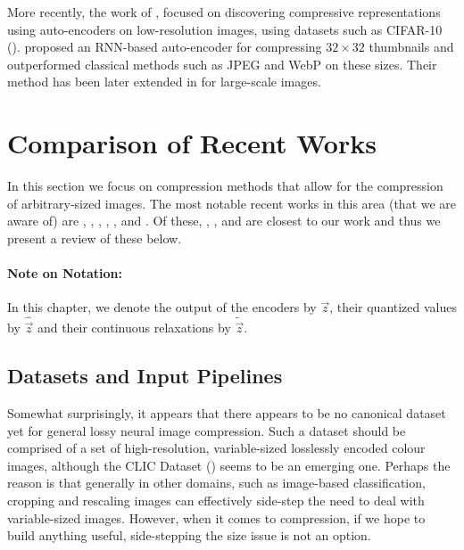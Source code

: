 \par 
More recently, the work of \cite{denton2015deep}, \cite{gregor2015draw} focused
on discovering compressive representations using auto-encoders on low-resolution
images, using datasets such as CIFAR-10 (\cite{krizhevsky2009learning}).
\cite{toderici2015variable} proposed an RNN-based auto-encoder for compressing $32
\times 32$ thumbnails and outperformed classical methods such as JPEG and WebP
on these sizes. Their method has been later extended in \cite{toderici2017full}
for large-scale images. 

\section{Comparison of Recent Works}
\label{sec:lit_comparison}
\par
In this section we focus on compression methods that allow for the compression
of arbitrary-sized images. The most notable recent works in this area (that we
are aware of) are \cite{balle2016end}, \cite{toderici2017full}, \cite{theis2017lossy},
\cite{rippel2017real}, \cite{balle2018variational}, \cite{johnston2018cvpr} and
\cite{mentzer2018cvpr}. Of these, \cite{balle2016end}, \cite{theis2017lossy},
\cite{rippel2017real} and \cite{balle2018variational} are closest to our work and
thus we present a review of these below.

\paragraph{Note on Notation:} In this chapter, we denote the output of the
encoders by $\vec{z}$, their quantized values by $\hat{\vec{z}}$ and their
continuous relaxations by $\tilde{\vec{z}}$.

\subsection{Datasets and Input Pipelines}
\label{sec:related_works_datasets}
\par
Somewhat surprisingly, it appears that there appears to be no canonical dataset
yet for general lossy neural image compression. Such a dataset should be
comprised of a set of high-resolution, variable-sized losslessly
encoded colour images, although the CLIC Dataset (\cite{clic2018}) seems to be
an emerging one. Perhaps the reason is that generally in other domains, such as
image-based classification, cropping and rescaling images can effectively
side-step the need to deal with variable-sized images. However, when it comes
to compression, if we hope to build anything useful, side-stepping the size
issue is not an option.


